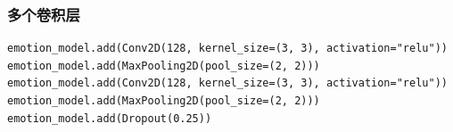 \documentclass{beamer}
\begin{document}
\begin{frame}[fragile]
	\frametitle{多个卷积层}
	\begin{verbatim}
emotion_model.add(Conv2D(128, kernel_size=(3, 3), activation="relu"))
emotion_model.add(MaxPooling2D(pool_size=(2, 2)))
emotion_model.add(Conv2D(128, kernel_size=(3, 3), activation="relu"))
emotion_model.add(MaxPooling2D(pool_size=(2, 2)))
emotion_model.add(Dropout(0.25))
\end{verbatim}
\end{frame}
\end{document}

